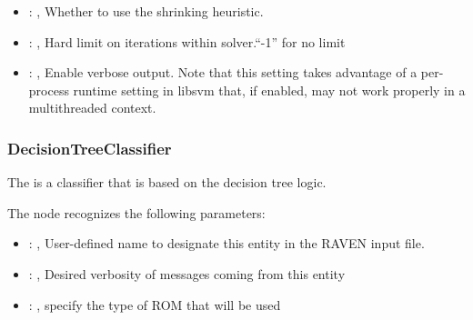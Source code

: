 \begin{itemize}
    \item {}: , 
      Whether to use the shrinking heuristic.

    \item {}: , 
      Hard limit on iterations within solver.``-1'' for no limit

    \item {}: , 
      Enable verbose output. Note that this setting takes advantage
      of a per-process runtime setting in libsvm that, if enabled, may not
      work properly in a multithreaded context.
  \end{itemize}


\subsubsection{DecisionTreeClassifier}
  The  is a classifier that is based on the
  decision tree logic.                          

  The  node recognizes the following parameters:
    \begin{itemize}
      \item {}: , 
        User-defined name to designate this entity in the RAVEN input file.
      \item {}: , 
        Desired verbosity of messages coming from this entity
      \item {}: , 
        specify the type of ROM that will be used
  \end{itemize}

